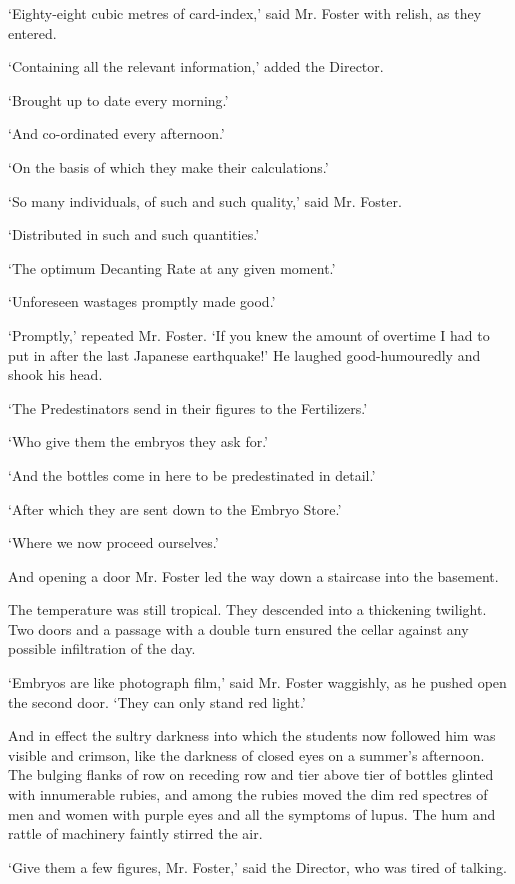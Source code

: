 \documentclass[10pt,a4paper]{article}
\newcommand{\sqm}[1]{‘#1’}
\begin{document}
\sqm{Eighty-eight cubic metres of card-index,} said Mr. Foster with relish, as they entered.

\sqm{Containing all the relevant information,} added the Director.

\sqm{Brought up to date every morning.}

\sqm{And co-ordinated every afternoon.}

\sqm{On the basis of which they make their calculations.}

\sqm{So many individuals, of such and such quality,} said Mr. Foster.

\sqm{Distributed in such and such quantities.}

\sqm{The optimum Decanting Rate at any given moment.}

\sqm{Unforeseen wastages promptly made good.}

\sqm{Promptly,} repeated Mr. Foster. \sqm{If you knew the amount of overtime I had to put in after the last Japanese earthquake!} He laughed good-humouredly and shook his head.

\sqm{The Predestinators send in their figures to the Fertilizers.}

\sqm{Who give them the embryos they ask for.}

\sqm{And the bottles come in here to be predestinated in detail.}

\sqm{After which they are sent down to the Embryo Store.}

\sqm{Where we now proceed ourselves.}

And opening a door Mr. Foster led the way down a staircase into the basement.

The temperature was still tropical. They descended into a thickening twilight. Two doors and a passage with a double turn ensured the cellar against any possible infiltration of the day.

\sqm{Embryos are like photograph film,} said Mr. Foster waggishly, as he pushed open the second door. \sqm{They can only stand red light.}

And in effect the sultry darkness into which the students now followed him was visible and crimson, like the darkness of closed eyes on a summer's afternoon. The bulging flanks of row on receding row and tier above tier of bottles glinted with innumerable rubies, and among the rubies moved the dim red spectres of men and women with purple eyes and all the symptoms of lupus. The hum and rattle of machinery faintly stirred the air.

\sqm{Give them a few figures, Mr. Foster,} said the Director, who was tired of talking.
\end{document}
